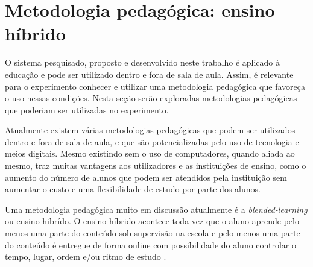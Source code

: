 

\section{Metodologia pedagógica: ensino híbrido}
\label{sec:flipped}


O sistema pesquisado, proposto e desenvolvido neste trabalho é aplicado à educação e pode ser utilizado dentro e fora de sala de aula. Assim, é relevante para o experimento conhecer e utilizar uma metodologia pedagógica que favoreça o uso nessas condições. Nesta seção serão exploradas metodologias pedagógicas que poderiam ser utilizadas no experimento.

Atualmente existem várias metodologias pedagógicas que podem ser utilizados dentro e fora de sala de aula, e que são potencializadas pelo uso de tecnologia e meios digitais. Mesmo existindo sem o uso de computadores, quando aliada ao mesmo, traz muitas vantagens aos utilizadores e as instituições de ensino, como o aumento do número de alunos que podem ser atendidos pela instituição sem aumentar o custo e uma flexibilidade de estudo por parte dos alunos. 

Uma metodologia pedagógica muito em discussão atualmente é a \emph{blended-learning} ou ensino hibrído. O ensino híbrido acontece toda vez que o aluno aprende pelo menos uma parte do conteúdo sob supervisão na escola e pelo menos uma parte do conteúdo é entregue de forma online com possibilidade do aluno controlar o tempo, lugar, ordem e/ou ritmo de estudo \cite{horn_rise_2011}.


